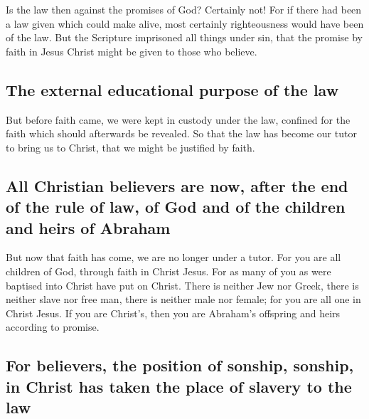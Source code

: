  Is the law then against the promises of God? Certainly
not! For if there had been a law given which could make alive, most
certainly righteousness would have been of the law.  But
the Scripture imprisoned all things under sin, that the promise by faith
in Jesus Christ might be given to those who believe.

\hypertarget{the-external-educational-purpose-of-the-law}{%
\subsection{The external educational purpose of the
law}\label{the-external-educational-purpose-of-the-law}}

 But before faith came, we were kept in custody under the
law, confined for the faith which should afterwards be revealed.
 So that the law has become our tutor to bring us to
Christ, that we might be justified by faith.

\hypertarget{all-christian-believers-are-now-after-the-end-of-the-rule-of-law-of-god-and-of-the-children-and-heirs-of-abraham}{%
\subsection{All Christian believers are now, after the end of the rule
of law, of God and of the children and heirs of
Abraham}\label{all-christian-believers-are-now-after-the-end-of-the-rule-of-law-of-god-and-of-the-children-and-heirs-of-abraham}}

 But now that faith has come, we are no longer under a
tutor.  For you are all children of God, through faith in
Christ Jesus.  For as many of you as were baptised into
Christ have put on Christ.  There is neither Jew nor
Greek, there is neither slave nor free man, there is neither male nor
female; for you are all one in Christ Jesus.  If you are
Christ's, then you are Abraham's offspring and heirs according to
promise.

\hypertarget{for-believers-the-position-of-sonship-sonship-in-christ-has-taken-the-place-of-slavery-to-the-law}{%
\subsection{For believers, the position of sonship, sonship, in Christ
has taken the place of slavery to the
law}\label{for-believers-the-position-of-sonship-sonship-in-christ-has-taken-the-place-of-slavery-to-the-law}}


